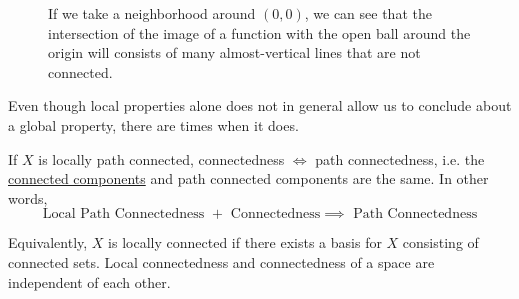 \begin{example}
\begin{figure}[H]
      \caption{If we take a neighborhood around $(0, 0)$, we can see that the intersection of the image of a function with the open ball around the origin will consists of many almost-vertical lines that are not connected.} 
      \label{fig:top_sine_curve_2}
    \end{figure}
  \end{example}

  Even though local properties alone does not in general allow us to conclude about a global property, there are times when it does. 

  \begin{theorem}
		\label{thm:lpc_c_implies_pc}
    If $X$ is locally path connected, connectedness $\iff$ path connectedness, i.e. the \hyperref[def:connected-components]{connected components} and path connected components are the same. In other words, 
    \begin{equation}
      \text{Local Path Connectedness } + \text{ Connectedness} \implies \text{ Path Connectedness}
    \end{equation}
  \end{theorem} 

  Equivalently, $X$ is locally connected if there exists a basis for $X$ consisting of connected sets. Local connectedness and connectedness of a space are independent of each other. 

